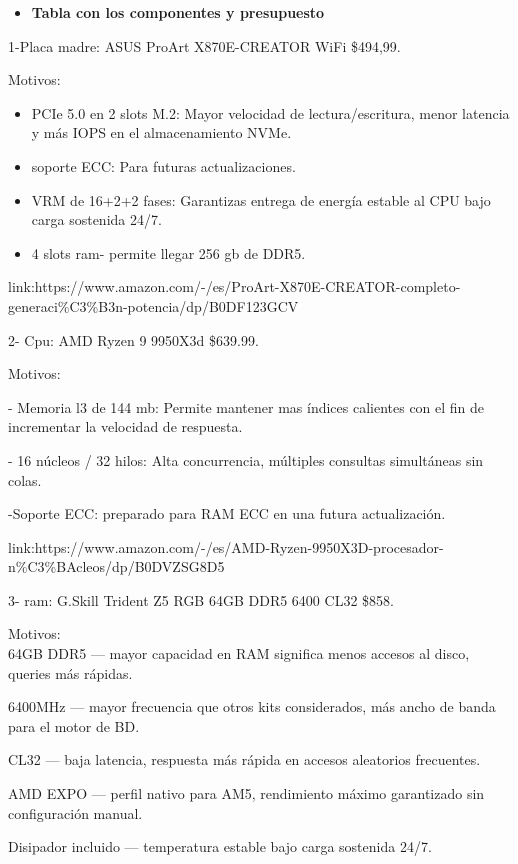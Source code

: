 \documentclass[14pt]{extarticle}
\begin{document}
\begin{itemize}
\item
  \textbf{Tabla con los componentes y presupuesto}
\end{itemize}

1-Placa madre: ASUS ProArt X870E-CREATOR WiFi \$494,99.

Motivos:

\begin{itemize}
\item
  PCIe 5.0 en 2 slots M.2: Mayor velocidad de lectura/escritura, menor
  latencia y más IOPS en el almacenamiento NVMe.
\item
  soporte ECC: Para futuras actualizaciones.
\item
  VRM de 16+2+2 fases: Garantizas entrega de energía estable al CPU bajo
  carga sostenida 24/7.
\item
  4 slots ram- permite llegar 256 gb de DDR5.
\end{itemize}

link:https://www.amazon.com/-/es/ProArt-X870E-CREATOR-completo-generaci\%C3\%B3n-potencia/dp/B0DF123GCV

2- Cpu: AMD Ryzen 9 9950X3d \$639.99.

Motivos:

- Memoria l3 de 144 mb: Permite mantener mas índices calientes con el
fin de incrementar la velocidad de respuesta.

- 16 núcleos / 32 hilos: Alta concurrencia, múltiples consultas
simultáneas sin colas.

-Soporte ECC: preparado para RAM ECC en una futura actualización.

link:https://www.amazon.com/-/es/AMD-Ryzen-9950X3D-procesador-n\%C3\%BAcleos/dp/B0DVZSG8D5

3- ram: G.Skill Trident Z5 RGB 64GB DDR5 6400 CL32 \$858.

Motivos:\\
64GB DDR5 --- mayor capacidad en RAM significa menos accesos al disco,
queries más rápidas.

6400MHz --- mayor frecuencia que otros kits considerados, más ancho de
banda para el motor de BD.

CL32 --- baja latencia, respuesta más rápida en accesos aleatorios
frecuentes.

AMD EXPO --- perfil nativo para AM5, rendimiento máximo garantizado sin
configuración manual.

Disipador incluido --- temperatura estable bajo carga sostenida 24/7.
\end{document}
